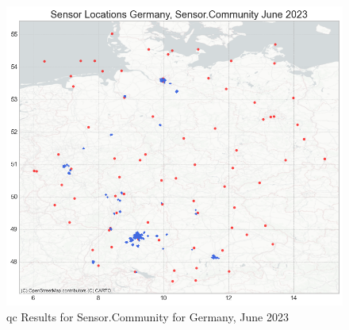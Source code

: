\begin{figure}[ht]
    \centering
    \includegraphics[width=1\textwidth]{images/sensor_community_locations_germany_after_qc_june_23.png}
    \caption{\gls{qc} Results for Sensor.Community for Germany, June 2023}
    \label{fig:qc sensor community germany june 23}
\end{figure}

